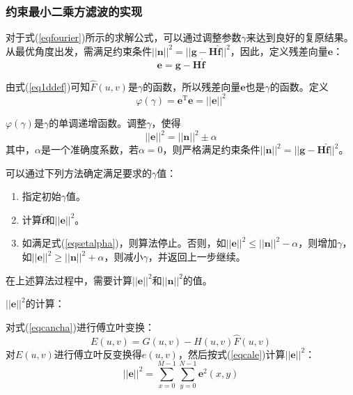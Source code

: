 \documentclass[UTF8]{ctexart}
\begin{document}
    \subsubsection{约束最小二乘方滤波的实现}
    对于式(\ref{eqfourier})所示的求解公式，可以通过调整参数$\gamma$来达到良好的复原结果。从最优角度出发，需满足约束条件$||\pmb{n}||^2=||\pmb{g}-\pmb{H}\hat{\pmb{f}}||^2$，因此，定义残差向量$\pmb{e}$：
    \begin{equation}\label{eqcancha}
        \pmb{e}=\pmb{g}-\pmb{H}\hat{\pmb{f}}
    \end{equation}

    由式(\ref{eq1ddef})可知$\hat{F}(u,v)$是$\gamma$的函数，所以残差向量$\pmb{e}$也是$\gamma$的函数。定义
    \begin{equation}
        \varphi(\gamma)=\pmb{e}^{\mathrm{T}}\pmb{e}=||\pmb{e}||^2
    \end{equation}

    $\varphi(\gamma)$是$\gamma$的单调递增函数。调整$\gamma$，使得
    \begin{equation}\label{eqsetalpha}
        ||\pmb{e}||^2=||\pmb{n}||^2 \pm \alpha
    \end{equation}
    其中，$\alpha$是一个准确度系数，若$\alpha=0$，则严格满足约束条件$||\pmb{n}||^2=||\pmb{g}-\pmb{H}\hat{\pmb{f}}||^2$。

    可以通过下列方法确定满足要求的$\gamma$值：
    \begin{enumerate}[label=(\arabic*),itemindent=2em,fullwidth]
        \item 指定初始$\gamma$值。
        \item 计算$\hat{\pmb{f}}$和$||\pmb{e}||^2$。
        \item 如满足式(\ref{eqsetalpha})，则算法停止。否则，如$||\pmb{e}||^2 \leq ||\pmb{n}||^2 - \alpha$，则增加$\gamma$，如$||\pmb{e}||^2 \geq ||\pmb{n}||^2 + \alpha$，则减小$\gamma$，并返回上一步继续。
    \end{enumerate}

    在上述算法过程中，需要计算$||\pmb{e}||^2$和$||\pmb{n}||^2$的值。

    $||\pmb{e}||^2$的计算：

    对式(\ref{eqcancha})进行傅立叶变换：
    \begin{equation}
        E(u,v)=G(u,v)-H(u,v)\hat{F}(u,v)
    \end{equation}
    对$E(u,v)$进行傅立叶反变换得$e(u,v)$，然后按式(\ref{eqcale})计算$||\pmb{e}||^2$：
    \begin{equation}\label{eqcale}
        ||\pmb{e}||^2=\sum\limits_{x=0}^{M-1}\sum\limits_{y=0}^{N-1} \pmb{e}^2(x,y)
    \end{equation}
\end{document}

